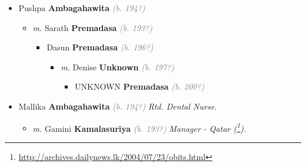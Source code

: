 \documentclass[10pt, openany]{book}
\begin{document}
\begin{itemize}
{\begin{itemize}
{\begin{itemize}
{\begin{itemize}
{\begin{itemize}
\item{\textit{m.} Chaminda \textbf{Geeganage} \textcolor{gray}{\textit{(b. 196?)}}   \label{couple:00000082:00002501} \begin{itemize}
\item{Daughter \textbf{Geeganage} \textcolor{gray}{\textit{(b. 199?)}}
 }
\item{Son \textbf{Geeganage} \textcolor{gray}{\textit{(b. 200?)}}
 }
\end{itemize}}
\end{itemize}
  }
\item{Randini \textbf{Ambagahawita} \textcolor{gray}{\textit{(b. 197?)}}
 }
\end{itemize}}
\end{itemize}
 }
\item{Pushpa \textbf{Ambagahawita} \textcolor{gray}{\textit{(b. 194?)}}
\begin{itemize}
\item{\textit{m.} Sarath \textbf{Premadasa} \textcolor{gray}{\textit{(b. 193?)}}   \label{couple:00000084:00000618} \begin{itemize}
\item{Dasun \textbf{Premadasa} \textcolor{gray}{\textit{(b. 196?)}}
\begin{itemize}
\item{\textit{m.} Denise \textbf{Unknown} \textcolor{gray}{\textit{(b. 197?)}}   \label{couple:00000617:00000871} \begin{itemize}
\item{UNKNOWN \textbf{Premadasa} \textcolor{gray}{\textit{(b. 200?)}}
 }
\end{itemize}}
\end{itemize}
 }
\end{itemize}}
\end{itemize}
 }
\item{Mallika \textbf{Ambagahawita} \textcolor{gray}{\textit{(b. 194?)}} \textcolor{slmaroon}{\textit{Rtd. Dental Nurse.}}
\begin{itemize}
\item{\textit{m.} Gamini \textbf{Kamalasuriya} \textcolor{gray}{\textit{(b. 193?)}} \textcolor{slmaroon}{\textit{Manager - Qatar (\footnote{\url{http://archives.dailynews.lk/2004/07/23/obits.html}}).}}   \label{couple:00000083:00000376} \begin{itemize}

\end{itemize}}
\end{itemize}}
\end{itemize}}
\end{itemize}
\end{document}
